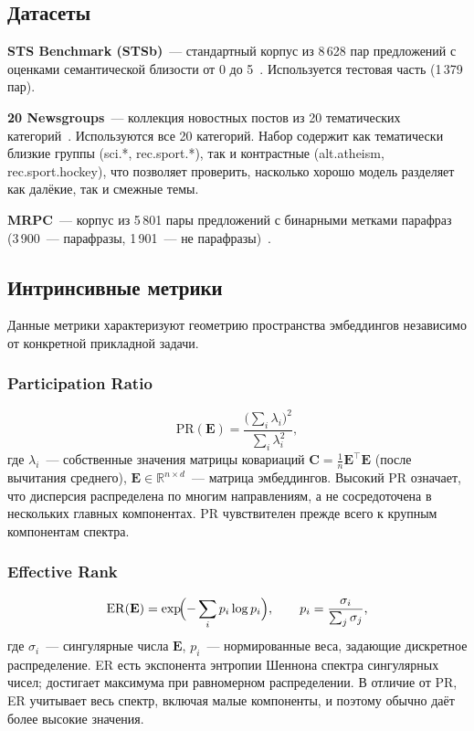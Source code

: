 \subsection{Датасеты}

\textbf{STS Benchmark (STSb)}~--- стандартный корпус из 8\,628 пар предложений
с оценками семантической близости от 0 до 5~.
Используется тестовая часть (1\,379 пар).

\textbf{20 Newsgroups}~--- коллекция новостных постов из 20 тематических
категорий~. Используются все 20 категорий. Набор содержит как
тематически близкие группы (sci.*, rec.sport.*), так и контрастные
(alt.atheism, rec.sport.hockey),
что позволяет проверить, насколько хорошо модель разделяет как
далёкие, так и смежные темы.

\textbf{MRPC}~--- корпус из 5\,801 пары предложений с бинарными метками
парафраз (3\,900~--- парафразы, 1\,901~--- не парафразы)~.

\subsection{Интринсивные метрики}
\label{ssec:intrinsic}

Данные метрики характеризуют геометрию пространства эмбеддингов независимо от
конкретной прикладной задачи.

\subsubsection{Participation Ratio}

\begin{equation*}
  \mathrm{PR}(\mathbf{E}) =
  \frac{\bigl(\sum_{i} \lambda_i\bigr)^2}{\sum_{i} \lambda_i^2},
\end{equation*}
где $\lambda_i$~--- собственные значения матрицы ковариаций
$\mathbf{C} = \tfrac{1}{n}\mathbf{E}^{\top}\mathbf{E}$ (после вычитания
среднего), $\mathbf{E} \in \mathbb{R}^{n \times d}$~--- матрица эмбеддингов.
Высокий PR означает, что дисперсия распределена по многим направлениям, а не
сосредоточена в нескольких главных компонентах. PR чувствителен прежде
всего к крупным компонентам спектра.

\subsubsection{Effective Rank}

\begin{equation*}
  \mathrm{ER}(\mathbf{E}) =
  \exp\!\Bigl(-\sum_{i} p_i \log p_i\Bigr),
  \qquad p_i = \frac{\sigma_i}{\sum_j \sigma_j},
\end{equation*}
где $\sigma_i$~--- сингулярные числа $\mathbf{E}$, $p_i$~--- нормированные
веса, задающие дискретное распределение. ER есть экспонента энтропии Шеннона
спектра сингулярных чисел; достигает максимума при равномерном распределении.
В отличие от PR, ER учитывает весь спектр, включая малые компоненты,
и поэтому обычно даёт более высокие значения.

